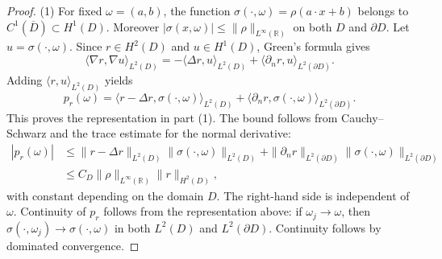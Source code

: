 \documentclass[11pt]{amsart}
\theoremstyle{definition}
\theoremstyle{remark}
\begin{document}
\begin{proof}
(1) For fixed $\omega=(a,b)$, the function
$\sigma(\cdot,\omega)=\rho(a\cdot x+b)$ belongs to
$C^1(\overline D)\subset H^1(D)$. Moreover
$|\sigma(x,\omega)|\le \|\rho\|_{L^\infty(\mathbb{R})}$ on both $D$ and
$\partial D$. Let $u=\sigma(\cdot,\omega)$. Since $r\in H^2(D)$ and $u\in H^1(D)$, Green's
formula gives
\begin{equation*}
\langle \nabla r,\nabla u\rangle_{L^2(D)}
=
-\langle \Delta r,u\rangle_{L^2(D)}
+
\langle \partial_n r,u\rangle_{L^2(\partial D)} .
\end{equation*}
Adding $\langle r,u\rangle_{L^2(D)}$ yields
\begin{equation*}
p_r(\omega)
=
\langle r-\Delta r,\sigma(\cdot,\omega)\rangle_{L^2(D)}
+
\langle \partial_n r,\sigma(\cdot,\omega)\rangle_{L^2(\partial D)} .
\end{equation*}
This proves the representation in part (1). 
The bound follows from Cauchy--Schwarz and the trace estimate for the normal derivative:
\begin{equation*}
\begin{aligned}
|p_r(\omega)|
&\le
\|r-\Delta r\|_{L^2(D)}
\|\sigma(\cdot,\omega)\|_{L^2(D)}
+
\|\partial_n r\|_{L^2(\partial D)}
\|\sigma(\cdot,\omega)\|_{L^2(\partial D)} \\
&\le
C_D \|\rho\|_{L^\infty(\mathbb{R})}\|r\|_{H^2(D)},
\end{aligned}
\end{equation*}
with constant depending on the domain $D$. 
The right-hand side is independent of $\omega$. Continuity of $p_r$ follows
from the representation above: if $\omega_j\to\omega$, then
$\sigma(\cdot,\omega_j)\to\sigma(\cdot,\omega)$ in both $L^2(D)$ and
$L^2(\partial D)$. Continuity follows by dominated convergence.


\end{proof}
\end{document}
